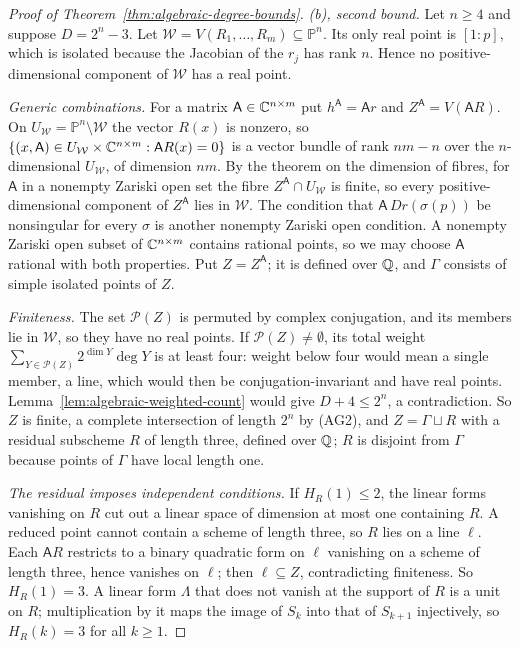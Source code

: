\begin{proof}[Proof of Theorem~\ref{thm:algebraic-degree-bounds}]
\emph{(b), second bound.} Let $n\ge4$ and suppose $D=2^n-3$. Let
$\mathcal W=V(R_1,\ldots,R_m)\subseteq\mathbb P^n$. Its only real point is
$[1:p]$, which is isolated because the Jacobian of the $r_j$ has rank $n$.
Hence no positive-dimensional component of $\mathcal W$ has a real point.

\emph{Generic combinations.} For a matrix $\mathsf A\in\mathbb C^{n\times m}$ put
$h^{\mathsf A}=\mathsf Ar$ and $Z^{\mathsf A}=V(\mathsf AR)$. On
$U_{\mathcal W}=\mathbb P^n\setminus\mathcal W$ the vector $R(x)$ is nonzero,
so $\{(x,\mathsf A)\in U_{\mathcal W}\times\mathbb C^{n\times m}:\mathsf AR(x)=0\}$
is a vector bundle of rank $nm-n$ over the $n$-dimensional $U_{\mathcal W}$,
of dimension $nm$. By the theorem on the dimension of fibres, for
$\mathsf A$ in a nonempty Zariski open set the fibre $Z^{\mathsf A}\cap
U_{\mathcal W}$ is finite, so every positive-dimensional component of
$Z^{\mathsf A}$ lies in $\mathcal W$. The condition that $\mathsf A\,Dr(\sigma(p))$
be nonsingular for every $\sigma$ is another nonempty Zariski open condition.
A nonempty Zariski open subset of $\mathbb C^{n\times m}$ contains rational points,
so we may choose $\mathsf A$ rational with both properties. Put
$Z=Z^{\mathsf A}$; it is defined over $\mathbb Q$, and $\Gamma$ consists of simple
isolated points of $Z$.

\emph{Finiteness.} The set $\mathcal P(Z)$ is permuted by complex
conjugation, and its members lie in $\mathcal W$, so they have no real points.
If $\mathcal P(Z)\ne\emptyset$, its total weight
$\sum_{Y\in\mathcal P(Z)}2^{\dim Y}\deg Y$ is at least four: weight below four
would mean a single member, a line, which would then be conjugation-invariant
and have real points. Lemma~\ref{lem:algebraic-weighted-count} would give
$D+4\le2^n$, a contradiction. So $Z$ is finite, a complete intersection of
length $2^n$ by (AG2), and $Z=\Gamma\sqcup R$ with a residual subscheme $R$ of
length three, defined over $\mathbb Q$; $R$ is disjoint from $\Gamma$ because
points of $\Gamma$ have local length one.

\emph{The residual imposes independent conditions.} If $H_R(1)\le2$, the
linear forms vanishing on $R$ cut out a linear space of dimension at most one
containing $R$. A reduced point cannot contain a scheme of length three, so
$R$ lies on a line $\ell$. Each $\mathsf AR$ restricts to a binary quadratic
form on $\ell$ vanishing on a scheme of length three, hence vanishes on
$\ell$; then $\ell\subseteq Z$, contradicting finiteness. So $H_R(1)=3$. A
linear form $\Lambda$ that does not vanish at the support of $R$ is a unit on
$R$; multiplication by it maps the image of $S_k$ into that of $S_{k+1}$
injectively, so $H_R(k)=3$ for all $k\ge1$.


\end{proof}
